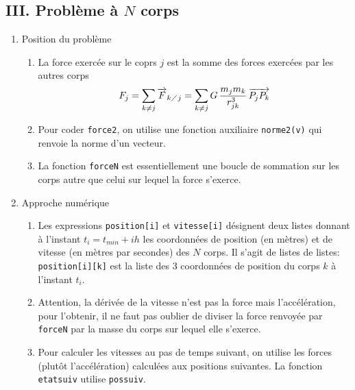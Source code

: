\subsection*{III. Problème à $N$ corps}
\begin{enumerate}
  \item Position du problème
\begin{enumerate}
  \item La force exercée sur le coprs $j$ est la somme des forces exercées par les autres corps
\begin{displaymath}
  F_j = \sum_{k\neq j} \overrightarrow{F}_{k\diagup j}
= \sum_{k\neq j} G\,\frac{m_j m_k}{r_{jk}^3}\, \overrightarrow{P_j P_k}
\end{displaymath}
  \item Pour coder \texttt{force2}, on utilise une fonction auxiliaire \texttt{norme2(v)} qui renvoie la norme d'un vecteur.
  
  
  \item La fonction \texttt{forceN} est essentiellement une boucle de sommation sur les corps autre que celui sur lequel la force s'exerce. 
\end{enumerate}

  \item Approche numérique
\begin{enumerate}
  \item Les expressions \texttt{position[i]} et \texttt{vitesse[i]} désignent deux listes donnant à l'instant $t_i = t_{min}+ih$ les coordonnées de position (en mètres) et de vitesse (en mètres par secondes) des $N$ corps. Il s'agit de listes de listes: \texttt{position[i][k]} est la liste des 3 coordonnées de position du corps $k$ à l'instant $t_i$.
  
  \item Attention, la dérivée de la vitesse n'est pas la force mais l'accélération, pour l'obtenir, il ne faut pas oublier de diviser la force renvoyée par \texttt{forceN} par la masse du corps sur lequel elle s'exerce.
  
  
  \item Pour calculer les vitesses au pas de temps suivant, on utilise les forces (plutôt l'accélération) calculées aux positions suivantes. La fonction \texttt{etat\textunderscore suiv} utilise \texttt{pos\textunderscore suiv}.
  
\end{enumerate}


\end{enumerate}
